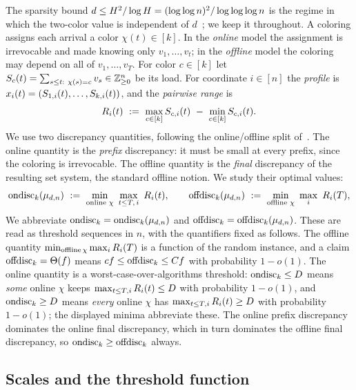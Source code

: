The sparsity bound $d\le H^2/\log H=(\log\log n)^2/\log\log\log n$ is the regime in which the two-color
value is independent of $d$~\cite{AT2025}; we keep it throughout.
A coloring assigns each arrival a color $\chi(t)\in[k]$. In the \emph{online} model the assignment is irrevocable
and made knowing only $v_1,\dots,v_t$; in the \emph{offline} model the coloring may depend on all of $v_1,\dots,v_T$.
For color $c\in[k]$ let $\load_c(t)=\sum_{s\le t:\ \chi(s)=c}v_s\in\Z_{\ge0}^n$ be its load. For coordinate $i\in[n]$
the \emph{profile} is $x_i(t)=(S_{1,i}(t),\dots,S_{k,i}(t))$, and the \emph{pairwise range} is
\[
  \rangeop_i(t)\ :=\ \max_{c\in[k]}\load_{c,i}(t)\ -\ \min_{c\in[k]}\load_{c,i}(t).
\]
We use two discrepancy quantities, following the online/offline split of~\cite{AT2025}. The online quantity is the
\emph{prefix} discrepancy: it must be small at every prefix, since the coloring is irrevocable. The offline quantity is the
\emph{final} discrepancy of the resulting set system, the standard offline notion. We study their optimal values:
\[
  \ondisc_k(\mu_{d,n})\ :=\ \min_{\text{online }\chi}\ \max_{t\le T,\,i}\ \rangeop_i(t),
  \qquad
  \offdisc_k(\mu_{d,n})\ :=\ \min_{\text{offline }\chi}\ \max_{i}\ \rangeop_i(T),
\]
We abbreviate $\mathrm{ondisc}_k=\mathrm{ondisc}_k(\mu_{d,n})$ and $\mathrm{offdisc}_k=\mathrm{offdisc}_k(\mu_{d,n})$. These are read as threshold sequences
in $n$, with the quantifiers fixed as follows. The offline quantity $\min_{\text{offline}\,\chi}\max_iR_i(T)$ is a
function of the random instance, and a claim $\mathrm{offdisc}_k=\Theta(f)$ means $cf\le\mathrm{offdisc}_k\le Cf$ with probability $1-o(1)$. The
online quantity is a worst-case-over-algorithms threshold: $\mathrm{ondisc}_k\le D$ means \emph{some} online $\chi$ keeps
$\max_{t\le T,i}R_i(t)\le D$ with probability $1-o(1)$, and $\mathrm{ondisc}_k\ge D$ means \emph{every} online $\chi$ has
$\max_{t\le T,i}R_i(t)\ge D$ with probability $1-o(1)$; the displayed minima abbreviate these. The online prefix
discrepancy dominates the online final discrepancy, which in turn dominates the offline final discrepancy, so
$\mathrm{ondisc}_k\ge\mathrm{offdisc}_k$ always.

\subsection{Scales and the threshold function}\label{sec:scales}

